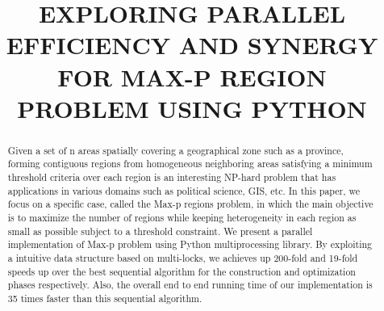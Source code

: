 \documentclass[conference]{IEEEtran}
\begin{document}
\title{EXPLORING PARALLEL EFFICIENCY AND SYNERGY FOR MAX-P REGION PROBLEM USING PYTHON\\
}

\author{
\and
{}
\and
{}
\and
{}
}

\maketitle

\begin{abstract}
Given a set of n areas spatially covering a geographical zone such as a
province, forming contiguous regions from homogeneous neighboring areas
satisfying a minimum threshold criteria over each region is an interesting
NP-hard problem that has applications in various domains such as political
science, GIS, etc. In this paper, we focus on a specific case, called the Max-p
regions problem, in which the main objective is to maximize the number of regions while
keeping heterogeneity in each region as small as possible subject to a threshold
constraint.  We
present a parallel implementation of Max-p problem using Python multiprocessing
library. By exploiting a intuitive data structure based on multi-locks, we
achieves up 200-fold and 19-fold speeds up over the best sequential algorithm for
the construction and optimization phases respectively. Also, the overall end to
end running time of our implementation is 35 times faster than this sequential
algorithm.
\end{abstract}
\end{document}

